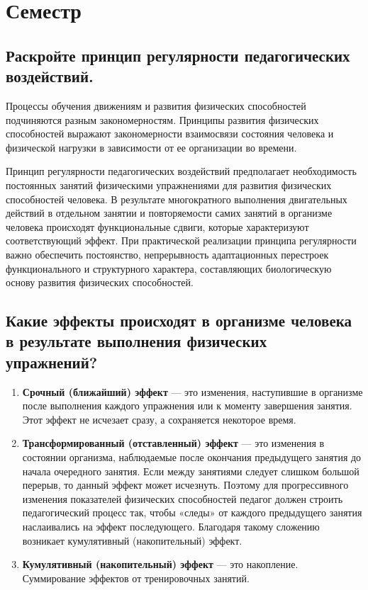 \section{Семестр}

\subsection{Раскройте принцип регулярности педагогических воздействий.}

Процессы обучения движениям и развития физических способностей подчиняются разным закономерностям.
Принципы развития физических способностей выражают закономерности взаимосвязи состояния человека и физической нагрузки
в зависимости от ее организации во времени.

Принцип регулярности педагогических воздействий предполагает необходимость постоянных занятий физическими упражнениями
для развития физических способностей человека.
В результате многократного выполнения двигательных действий в отдельном занятии и повторяемости самих занятий
в организме человека происходят функциональные сдвиги, которые характеризуют соответствующий эффект.
При практической реализации принципа регулярности важно обеспечить постоянство, непрерывность
адаптационных перестроек функционального и структурного характера, составляющих биологическую основу развития
физических способностей.


\subsection{Какие эффекты происходят в организме человека в результате выполнения физических упражнений?}

\begin{enumerate}
    \item \textbf{Срочный (ближайший) эффект} --- это изменения, наступившие в организме после выполнения каждого упражнения или к моменту завершения занятия. Этот эффект не исчезает сразу, а сохраняется некоторое время.
    \item \textbf{Трансформированный (отставленный) эффект} --- это изменения в состоянии организма, наблюдаемые после окончания предыдущего занятия до начала очередного занятия. Если между занятиями следует слишком большой перерыв, то данный эффект может исчезнуть. Поэтому для прогрессивного изменения показателей физических способностей педагог должен строить педагогический процесс так, чтобы «следы» от каждого предыдущего занятия наслаивались на эффект последующего. Благодаря такому сложению возникает кумулятивный (накопительный) эффект.
    \item \textbf{Кумулятивный (накопительный) эффект} --- это накопление. Суммирование эффектов от тренировочных занятий.
\end{enumerate}


